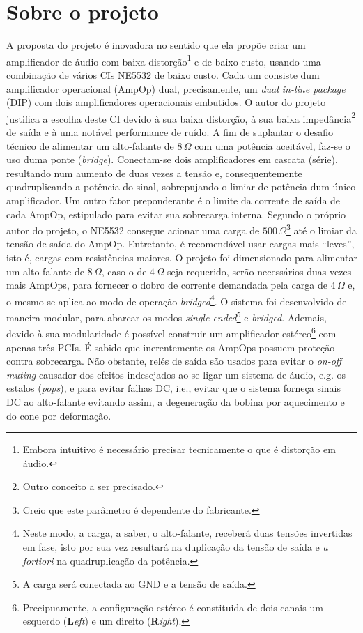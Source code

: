\documentclass[12pt, a4paper, leqno, twoside]{book}
\def\ohm{\,\Omega}
\def\ampop{AmpOp}
\begin{document}
  \section{Sobre o projeto} 
  A proposta do projeto \'e inovadora no sentido que ela prop\~oe criar um amplificador de \'audio com baixa distor\c c\~ao\footnote{Embora intuitivo \'e necess\'ario precisar tecnicamente o que \'e distor\c c\~ao em \'audio.} e de baixo custo, usando uma combina\c c\~ao de v\'arios CIs NE5532 de baixo custo. Cada um consiste dum amplificador operacional (\ampop) dual, precisamente, um {\it dual in-line package} (DIP) com dois amplificadores operacionais embutidos. O autor do projeto justifica a escolha deste CI devido \`a sua baixa distor\c c\~ao, \`a sua baixa imped\^ancia\footnote{Outro conceito a ser precisado.} de sa\'ida e \`a uma not\'avel performance de ru\'ido. A fim de suplantar o desafio t\'ecnico de alimentar um alto-falante de $8\ohm$ com uma pot\^encia aceit\'avel, faz-se o uso duma ponte ({\it bridge}). Conectam-se dois amplificadores em cascata (s\'erie), resultando num aumento de duas vezes a tens\~ao e, consequentemente quadruplicando a pot\^encia do sinal, sobrepujando o limiar de pot\^encia dum \'unico amplificador. Um outro fator preponderante \'e o limite da corrente de sa\'ida de cada \ampop, estipulado para evitar sua sobrecarga interna. Segundo o pr\'oprio autor do projeto, o NE5532 consegue acionar uma carga de $500\ohm$\footnote{Creio que este par\^ametro \'e dependente do fabricante.} at\'e o limiar da tens\~ao de sa\'ida do \ampop. Entretanto, \'e recomend\'avel usar cargas mais ``leves'', isto \'e, cargas com resist\^encias maiores. O projeto foi dimensionado para alimentar um alto-falante de $8\ohm$, caso o de $4\ohm$ seja requerido, ser\~ao necess\'arios duas vezes mais \ampop{s}, para fornecer o dobro de corrente demandada pela carga de $4\ohm$ e, o mesmo se aplica ao modo de opera\c c\~ao {\it bridged\/}\footnote{Neste modo, a carga, a saber, o alto-falante, receber\'a duas tens\~oes invertidas em fase, isto por sua vez resultar\'a na duplica\c c\~ao da tens\~ao de sa\'ida e {\it a fortiori} na quadruplica\c c\~ao da pot\^encia.}. O sistema foi desenvolvido de maneira modular, para abarcar os modos {\it single-ended\/}\footnote{A carga ser\'a conectada ao GND e a tens\~ao de sa\'ida.} e {\it bridged}. Ademais, devido \`a sua modularidade \'e poss\'ivel construir um amplificador est\'ereo\footnote{Precipuamente, a configura\c c\~ao est\'ereo \'e constituida de dois canais um esquerdo ({\bf L}{\it eft}) e um direito ({\bf R}{\it ight}).} com apenas tr\^es PCIs. \'E sabido que inerentemente os \ampop{s} possuem prote\c c\~ao contra sobrecarga. N\~ao obstante, rel\'es de sa\'ida s\~ao usados para evitar o {\it on-off muting} causador dos efeitos indesejados ao se ligar um sistema de \'audio, e.g. os estalos ({\it pops}), e para evitar falhas DC, i.e., evitar que o sistema forneça sinais DC ao alto-falante evitando assim, a degenera\c c\~ao da bobina por aquecimento e do cone por deforma\c c\~ao. 
\end{document}
